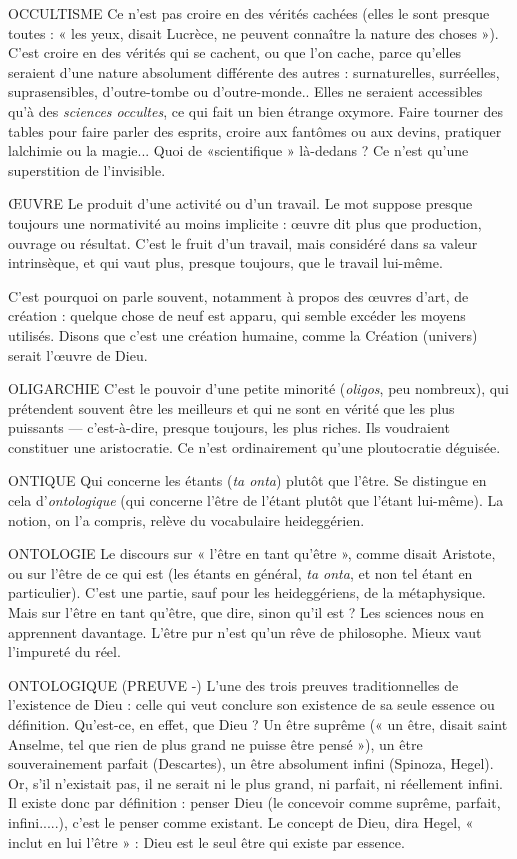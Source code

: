 OCCULTISME Ce n’est pas croire en des vérités cachées (elles le sont presque
toutes : « les yeux, disait Lucrèce, ne peuvent connaître la
nature des choses »). C’est croire en des vérités qui se cachent, ou que l’on
cache, parce qu’elles seraient d’une nature absolument différente des autres :
surnaturelles, surréelles, suprasensibles, d’outre-tombe ou d’outre-monde..
Elles ne seraient accessibles qu’à des {\it sciences occultes}, ce qui fait un bien étrange
oxymore. Faire tourner des tables pour faire parler des esprits, croire aux fantômes
ou aux devins, pratiquer lalchimie ou la magie... Quoi de
«scientifique » là-dedans ? Ce n’est qu’une superstition de l’invisible.

ŒUVRE Le produit d’une activité ou d’un travail. Le mot suppose presque
toujours une normativité au moins implicite : œuvre dit plus que
production, ouvrage ou résultat. C’est le fruit d’un travail, mais considéré dans
sa valeur intrinsèque, et qui vaut plus, presque toujours, que le travail lui-même.

C’est pourquoi on parle souvent, notamment à propos des œuvres d’art, de
création : quelque chose de neuf est apparu, qui semble excéder les moyens utilisés.
Disons que c’est une création humaine, comme la Création (univers)
serait l’œuvre de Dieu.

OLIGARCHIE C'est le pouvoir d’une petite minorité ({\it oligos}, peu nombreux),
qui prétendent souvent être les meilleurs et qui ne sont en
vérité que les plus puissants — c’est-à-dire, presque toujours, les plus riches. Ils
voudraient constituer une aristocratie. Ce n’est ordinairement qu’une ploutocratie déguisée.

ONTIQUE Qui concerne les étants ({\it ta onta}) plutôt que l’être. Se distingue
en cela d’{\it ontologique} (qui concerne l’être de l’étant plutôt que
l’étant lui-même). La notion, on l’a compris, relève du vocabulaire heideggérien.

ONTOLOGIE Le discours sur « l’être en tant qu'être », comme disait Aristote,
ou sur l’être de ce qui est (les étants en général, {\it ta onta},
et non tel étant en particulier). C’est une partie, sauf pour les heideggériens, de
la métaphysique. Mais sur l’être en tant qu'être, que dire, sinon qu'il est ? Les
sciences nous en apprennent davantage. L’être pur n’est qu’un rêve de philosophe.
Mieux vaut l’impureté du réel.

ONTOLOGIQUE (PREUVE -) L’une des trois preuves traditionnelles de
l'existence de Dieu : celle qui veut conclure
son existence de sa seule essence ou définition. Qu'est-ce, en effet, que Dieu ?
Un être suprême (« un être, disait saint Anselme, tel que rien de plus grand ne
puisse être pensé »), un être souverainement parfait (Descartes), un être absolument
infini (Spinoza, Hegel). Or, s’il n'existait pas, il ne serait ni le plus grand,
ni parfait, ni réellement infini. Il existe donc par définition : penser Dieu (le
concevoir comme suprême, parfait, infini.....), c’est le penser comme existant.
Le concept de Dieu, dira Hegel, « inclut en lui l’être » : Dieu est le seul être qui
existe par essence.

